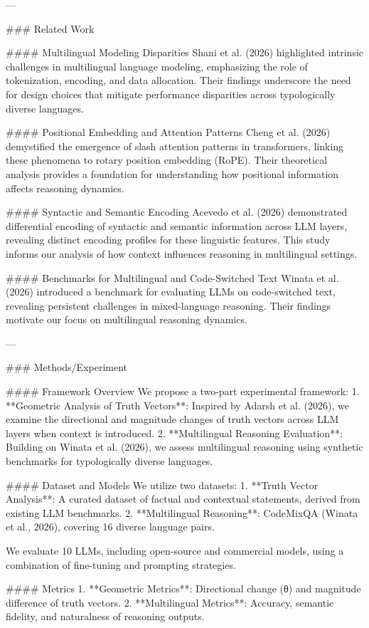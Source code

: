 ---

### Related Work

#### Multilingual Modeling Disparities
Shani et al. (2026) highlighted intrinsic challenges in multilingual language modeling, emphasizing the role of tokenization, encoding, and data allocation. Their findings underscore the need for design choices that mitigate performance disparities across typologically diverse languages.

#### Positional Embedding and Attention Patterns
Cheng et al. (2026) demystified the emergence of slash attention patterns in transformers, linking these phenomena to rotary position embedding (RoPE). Their theoretical analysis provides a foundation for understanding how positional information affects reasoning dynamics.

#### Syntactic and Semantic Encoding
Acevedo et al. (2026) demonstrated differential encoding of syntactic and semantic information across LLM layers, revealing distinct encoding profiles for these linguistic features. This study informs our analysis of how context influences reasoning in multilingual settings.

#### Benchmarks for Multilingual and Code-Switched Text
Winata et al. (2026) introduced a benchmark for evaluating LLMs on code-switched text, revealing persistent challenges in mixed-language reasoning. Their findings motivate our focus on multilingual reasoning dynamics.

---

### Methods/Experiment

#### Framework Overview
We propose a two-part experimental framework:
1. **Geometric Analysis of Truth Vectors**: Inspired by Adarsh et al. (2026), we examine the directional and magnitude changes of truth vectors across LLM layers when context is introduced.
2. **Multilingual Reasoning Evaluation**: Building on Winata et al. (2026), we assess multilingual reasoning using synthetic benchmarks for typologically diverse languages.

#### Dataset and Models
We utilize two datasets:
1. **Truth Vector Analysis**: A curated dataset of factual and contextual statements, derived from existing LLM benchmarks.
2. **Multilingual Reasoning**: CodeMixQA (Winata et al., 2026), covering 16 diverse language pairs.

We evaluate 10 LLMs, including open-source and commercial models, using a combination of fine-tuning and prompting strategies.

#### Metrics
1. **Geometric Metrics**: Directional change (θ) and magnitude difference of truth vectors.
2. **Multilingual Metrics**: Accuracy, semantic fidelity, and naturalness of reasoning outputs.

